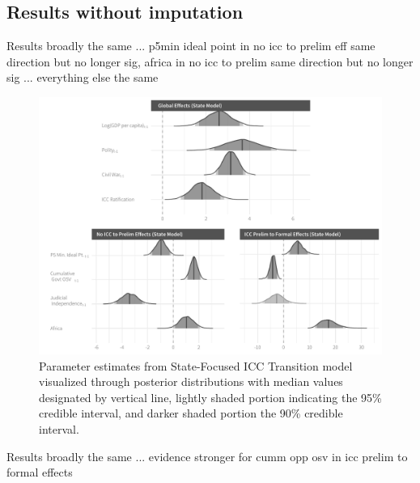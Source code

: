 \subsection*{Results without imputation}

Results broadly the same ... p5min ideal point in no icc to prelim eff same direction but no longer sig, africa in no icc to prelim same direction but no longer sig ... everything else the same

\begin{figure}
    \centering
    \includegraphics[width=1\textwidth]{stateCoefSumm_noImp.pdf}
    \caption{Parameter estimates from State-Focused ICC Transition model visualized through posterior distributions with median values designated by vertical line, lightly shaded portion indicating the 95\% credible interval, and darker shaded portion the 90\% credible interval.}
    \label{fig:stateModel}
\end{figure}

Results broadly the same ... evidence stronger for cumm opp osv in icc prelim to formal effects

